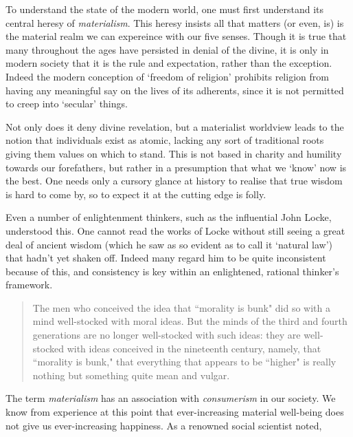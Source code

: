 \documentclass[letterpaper]{article}
\begin{document}
To understand the state of the modern world, one must first understand its central heresy of \textit{materialism}. This heresy insists all that matters (or even, is) is the material realm we can expereince with our five senses. Though it is true that many throughout the ages have persisted in denial of the divine, it is only in modern society that it is the rule and expectation, rather than the exception. Indeed the modern conception of `freedom of religion' prohibits religion from having any meaningful say on the lives of its adherents, since it is not permitted to creep into `secular' things.

Not only does it deny divine revelation, but a materialist worldview leads to the notion that individuals exist as atomic, lacking any sort of traditional roots giving them values on which to stand. This is not based in charity and humility towards our forefathers, but rather in a presumption that what we `know' now is the best. One needs only a cursory glance at history to realise that true wisdom is hard to come by, so to expect it at the cutting edge is folly.

Even a number of enlightenment thinkers, such as the influential John Locke, understood this. One cannot read the works of Locke without still seeing a great deal of ancient wisdom (which he saw as so evident as to call it `natural law') that hadn't yet shaken off. Indeed many regard him to be quite inconsistent because of this, and consistency is key within an enlightened, rational thinker's framework.

\begin{quote}
  The men who conceived the idea that ``morality is bunk" did so with a mind well-stocked with moral ideas. But the minds of the third and fourth generations are no longer well-stocked with such ideas: they are well-stocked with ideas conceived in the nineteenth century, namely, that ``morality is bunk," that everything that appears to be ``higher" is really nothing but something quite mean and vulgar.
\end{quote}

The term \textit{materialism} has an association with \textit{consumerism} in our society. We know from experience at this point that ever-increasing material well-being does not give us ever-increasing happiness. As a renowned social scientist noted,
\end{document}
